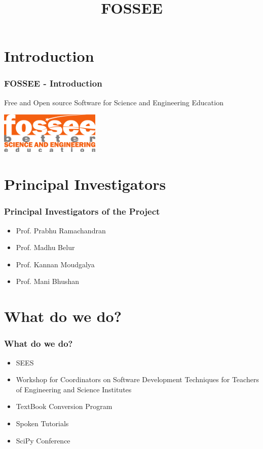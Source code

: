 \documentclass{beamer}
\title{FOSSEE}
\institute[IIT Bombay] {IIT Bombay}
\date{}
\begin{document}
\begin{frame}
  \maketitle  
\end{frame}


\section{Introduction}
\begin{frame}
  \frametitle{{FOSSEE} - Introduction}
  Free and Open source Software for Science and Engineering Education 
  \begin{center}
  	\includegraphics[scale=2]{fossee.png} \\
  \end{center}
\end{frame}

\section{Principal Investigators}
\begin{frame}
  \frametitle{Principal Investigators of the Project}
  \begin{itemize}
  \item Prof. Prabhu Ramachandran
  \item Prof. Madhu Belur
  \item Prof. Kannan Moudgalya
  \item Prof. Mani Bhushan
  \end{itemize}
\end{frame}


\section{What do we do?}
\begin{frame}
  \frametitle{What do we do?}
  \begin{itemize}
  \item SEES
  \item Workshop for Coordinators on Software Development Techniques for Teachers of Engineering and Science Institutes
  \item TextBook Conversion Program
  \item Spoken Tutorials
  \item SciPy Conference  
  \end{itemize}
\end{frame}
\end{document}
